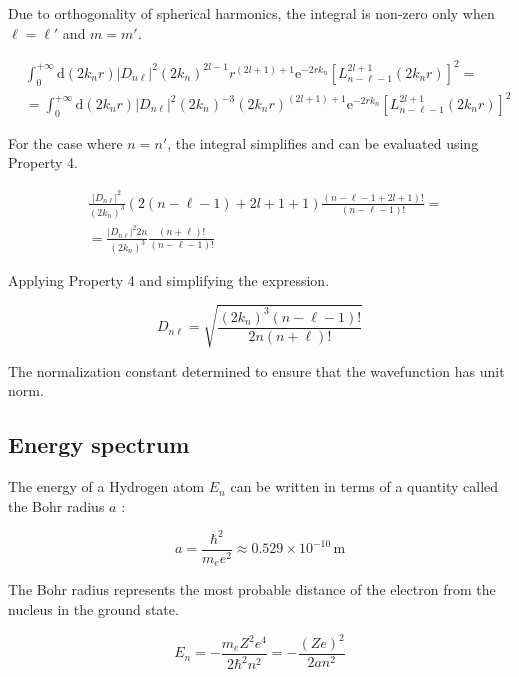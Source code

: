 \documentclass[italian]{HKNdocument}
\begin{document}
Due to orthogonality of spherical harmonics, the integral is non-zero only when $\ell=\ell'$ and $m=m'$.

\begin{align}
& \int_{0}^{+\infty} \mathrm{d}\left(2 k_{n} r\right)\left|D_{n \ell}\right|^{2}\left(2 k_{n}\right)^{2 l-1} r^{(2 l+1)+1} \mathrm{e}^{-2 r k_{n}}\left[L_{n-\ell-1}^{2 l+1}\left(2 k_{n} r\right)\right]^{2}= \\
& =\int_{0}^{+\infty} \mathrm{d}\left(2 k_{n} r\right)\left|D_{n \ell}\right|^{2}\left(2 k_{n}\right)^{-3}\left(2 k_{n} r\right)^{(2 l+1)+1} \mathrm{e}^{-2 r k_{n}}\left[L_{n-\ell-1}^{2 l+1}\left(2 k_{n} r\right)\right]^{2}
\end{align}

For the case where $n=n'$, the integral simplifies and can be evaluated using Property 4.

\begin{align}
& \frac{\left|D_{n \ell}\right|^{2}}{\left(2 k_{n}\right)^{3}}(2(n-\ell-1)+2 l+1+1) \frac{(n-\ell-1+2 l+1)!}{(n-\ell-1)!}=  \\
& =\frac{\left|D_{n \ell}\right|^{2} 2 n}{\left(2 k_{n}\right)^{3}} \frac{(n+\ell)!}{(n-\ell-1)!}
\end{align}

Applying Property 4 and simplifying the expression.

\begin{equation}
D_{n \ell}=\sqrt{\frac{\left(2 k_{n}\right)^{3}(n-\ell-1)!}{2 n(n+\ell)!}}
\end{equation}

The normalization constant determined to ensure that the wavefunction has unit norm.

\subsection{Energy spectrum}
The energy of a Hydrogen atom $E_{n}$ can be written in terms of a quantity called the Bohr radius $a$ :

\begin{equation}
a=\frac{\hbar^{2}}{m_{e} e^{2}} \approx 0.529 \times 10^{-10} \, \mathrm{m}
\end{equation}

The Bohr radius represents the most probable distance of the electron from the nucleus in the ground state.

\begin{equation}
E_{n}=-\frac{m_{e} Z^{2} e^{4}}{2 \hbar^{2} n^{2}}=-\frac{(Z e)^{2}}{2 a n^{2}}
\end{equation}
\end{document}

